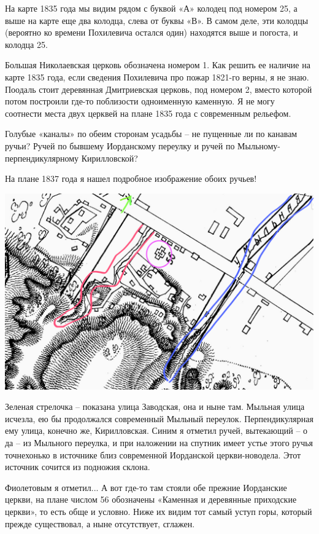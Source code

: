 На карте 1835 года мы видим рядом с буквой «А» колодец под номером 25, а выше на карте  еще два колодца, слева от буквы «В». В самом деле, эти колодцы (вероятно ко времени Похилевича остался один) находятся выше и погоста, и колодца 25.

Большая Николаевская церковь обозначена номером 1. Как решить ее наличие на карте 1835 года, если сведения Похилевича про пожар 1821-го верны, я не знаю. Поодаль стоит деревянная Дмитриевская церковь, под номером 2, вместо которой потом построили где-то поблизости одноименную каменную. Я не могу соотнести места двух церквей на плане 1835 года с современным рельефом.

Голубые «каналы» по обеим сторонам усадьбы – не пущенные ли по канавам ручьи? Ручей по бывшему Иорданскому переулку и ручей по Мыльному-перпендикулярному Кирилловской?

На плане 1837 года я нашел подробное изображение обоих ручьев!

\begin{center}
\includegraphics[width=\linewidth]{chast-kirvys/iordanruch/map.png}
\end{center}

Зеленая стрелочка – показана улица Заводская, она и ныне там. Мыльная улица исчезла, ею бы продолжался современный Мыльный переулок. Перпендикулярная ему улица, конечно же, Кирилловская. Синим я отметил ручей, вытекающий – о да – из Мыльного переулка, и при наложении на спутник имеет устье этого ручья точнехонько в источнике близ современной Иорданской церкви-новодела. Этот источник сочится из подножия склона.

Фиолетовым я отметил... А вот где-то там стояли 
обе прежние Иорданские церкви, на плане числом 56 обозначены «Каменная и деревянные приходские церкви», то есть обще и условно. Ниже их видим тот самый уступ горы, который прежде существовал, а ныне отсутствует, сглажен.

